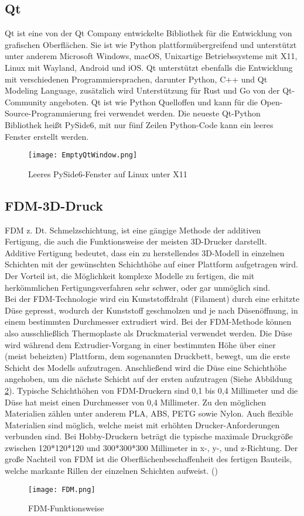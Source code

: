 \subsection{Qt}
\label{subsec:tQt}
Qt ist eine von der Qt Company entwickelte Bibliothek für die Entwicklung von grafischen Oberflächen. Sie ist wie Python plattformübergreifend und unterstützt unter anderem Microsoft Windows, macOS, Unixartige Betriebssysteme mit X11, Linux mit Wayland, Android und iOS. Qt unterstützt ebenfalls die Entwicklung mit verschiedenen Programmiersprachen, darunter Python, C++ und Qt Modeling Language, zusätzlich wird Unterstützung für Rust und Go von der Qt-Community angeboten. Qt ist wie Python Quelloffen und kann für die Open-Source-Programmierung frei verwendet werden. Die neueste Qt-Python Bibliothek heißt PySide6, mit nur fünf Zeilen Python-Code kann ein leeres Fenster erstellt werden.
\begin{figure}[h]
\centering
\texttt{[image: EmptyQtWindow.png]}
\caption{Leeres PySide6-Fenster auf Linux unter X11}
\label{fig:EmptyQtWindow}
\end{figure}

\subsection{FDM-3D-Druck}
\label{subsec:tFDM}
\ac{FDM} z. Dt. Schmelzschichtung, ist eine gängige Methode der additiven Fertigung, die auch die Funktionsweise der meisten \ac{3D}-Drucker darstellt. Additive Fertigung bedeutet, dass ein zu herstellendes \ac{3D}-Modell in einzelnen Schichten mit der gewünschten Schichthöhe auf einer Plattform aufgetragen wird. Der Vorteil ist, die Möglichkeit komplexe Modelle zu fertigen, die mit herkömmlichen Fertigungsverfahren sehr schwer, oder gar unmöglich sind.\\
Bei der \ac{FDM}-Technologie wird ein Kunststoffdraht (Filament) durch eine erhitzte Düse gepresst, wodurch der Kunststoff geschmolzen und je nach Düsenöffnung, in einem bestimmten Durchmesser extrudiert wird. Bei der \ac{FDM}-Methode können also ausschließlich Thermoplaste als Druckmaterial verwendet werden. Die Düse wird während dem Extrudier-Vorgang in einer bestimmten Höhe über einer (meist beheizten) Plattform, dem sogenannten Druckbett, bewegt, um die erste Schicht des Modells aufzutragen. Anschließend wird die Düse eine Schichthöhe angehoben, um die nächste Schicht auf der ersten aufzutragen (Siehe Abbildung \ref{fig:FDM}). Typische Schichthöhen von \ac{FDM}-Druckern sind 0,1 bis 0,4 Millimeter und die Düse hat meist einen Durchmesser von 0,4 Millimeter. Zu den möglichen Materialien zählen unter anderem \ac{PLA}, \ac{ABS}, \ac{PETG} sowie Nylon. Auch flexible Materialien sind möglich, welche meist mit erhöhten Drucker-Anforderungen verbunden sind. Bei Hobby-Druckern beträgt die typische maximale Druckgröße zwischen 120*120*120 und 300*300*300 Millimeter in x-, y-, und z-Richtung. Der große Nachteil von \ac{FDM} ist die Oberflächenbeschaffenheit des fertigen Bauteils, welche markante Rillen der einzelnen Schichten aufweist. (\cite{alexandreFDM})
\begin{figure}[h]
\centering
\texttt{[image: FDM.png]}
\caption{FDM-Funktionsweise}
\label{fig:FDM}
\end{figure}

